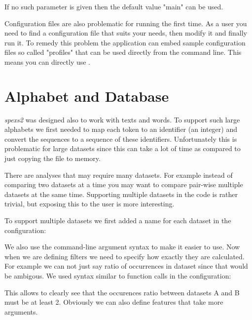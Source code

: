 If no such parameter is given then the default value "main" can be used.

Configuration files are also problematic for running the first time. As a user you need to find a configuration file that suits your needs, then modify it and finally run it. To remedy this problem the application can embed sample configuration files so called "profiles" that can be used directly from the command line. This means you can directly use .

\section{Alphabet and Database}

\emph{spexs2} was designed also to work with texts and words. To support such large alphabets we first needed to map each token to an identifier (an integer) and convert the sequences to a sequence of these identifiers. Unfortunately this is problematic for large datasets since this can take a lot of time as compared to just copying the file to memory.

There are analyses that may require many datasets. For example instead of comparing two datasets at a time you may want to compare pair-wise multiple datasets at the same time. Supporting multiple datasets in the code is rather trivial, but exposing this to the user is more interesting.

To support multiple datasets we first added a name for each dataset in the configuration:

\begin{file}
"Datasets" : {
    "A" : { "File" : "$A$" },
    "B" : { "File" : "$B$" },
    "C" : { "File" : "$C$" },
    ...
\end{file}

We also use the command-line argument syntax to make it easier to use. Now when we are defining filters we need to specify how exactly they are calculated. For example we can not just say ratio of occurrences in dataset since that would be ambigous. We used syntax similar to function calls in the configuration:

\begin{file}
...
"Extension": {
    "Outputtable": {
        "OccurencesRatio(A, B)" : {"min" : 2},
        ...
\end{file}

This allows to clearly see that the occurences ratio between datasets A and B must be at least 2. Obviously we can also define features that take more arguments.

